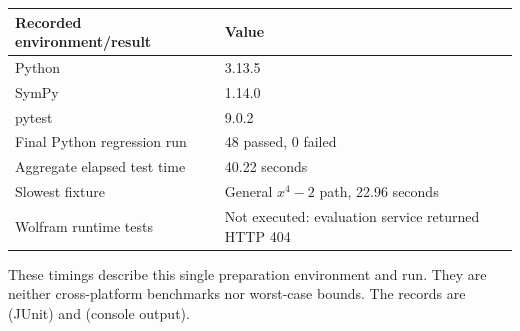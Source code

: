 \begin{center}
\begin{tabular}{@{}ll@{}}
\toprule
Recorded environment/result & Value\\
\midrule
Python & 3.13.5\\
SymPy & 1.14.0\\
pytest & 9.0.2\\
Final Python regression run & 48 passed, 0 failed\\
Aggregate elapsed test time & 40.22 seconds\\
Slowest fixture & General $x^4-2$ path, 22.96 seconds\\
Wolfram runtime tests & Not executed: evaluation service returned HTTP 404\\
\bottomrule
\end{tabular}
\end{center}
These timings describe this single preparation environment and run. They are
neither cross-platform benchmarks nor worst-case bounds. The records are
 (JUnit) and
 (console output).
